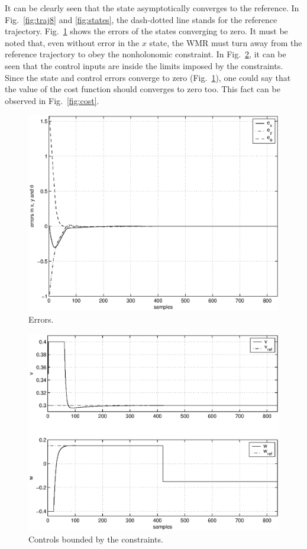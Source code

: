 \documentclass[conference]{IEEEtran} %
\begin{document}
It can be clearly seen that the state asymptotically converges to the
reference. In Fig.~\ref{fig:traj8} and \ref{fig:states}, the dash-dotted
line stands for the reference trajectory.
Fig.~\ref{fig:errors} shows the errors of the states converging to zero. It
must be noted that, even without error in the $x$ state, the WMR must turn
away from the reference trajectory to obey the nonholonomic constraint. In
Fig.~\ref{fig:controls}, it can be seen that the control inputs are inside
the limits imposed by the constraints. Since the state and control errors
converge to zero (Fig.~\ref{fig:errors}), one could say that the value of
the cost function should converges to zero too. This fact can be observed in
Fig.~\ref{fig:cost}.

\begin{figure}
	\centering
	\includegraphics[width=.95\linewidth]{Figures/errors.eps}
	\caption{Errors.}
    	\label{fig:errors}
\end{figure}
\begin{figure}
	\centering
    	\includegraphics[width=.95\linewidth]{Figures/controls.eps}
    	\caption{Controls bounded by the constraints.}
    	\label{fig:controls}
\end{figure}
\end{document}
